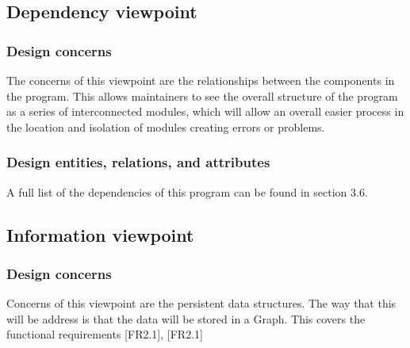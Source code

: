\documentclass[12pt]{article}
\begin{document}
        \newpage
        
                
        
        \subsection{Dependency viewpoint}%
            
            \subsubsection{Design concerns}
            The concerns of this viewpoint are the relationships between the components in the program. This allows maintainers to see the overall structure of the program as a series of interconnected modules, which will allow an overall easier process in the location and isolation of modules creating errors or problems.
            
            \subsubsection{Design entities, relations, and attributes}
            A full list of the dependencies of this program can be found in section 3.6.
        
        \subsection{Information viewpoint}%
            \subsubsection{Design concerns}
                Concerns of this viewpoint are the persistent data structures. The way that this will be address is that the data will be stored in a Graph. This covers the functional requirements [FR2.1], [FR2.1]
            
\end{document}
